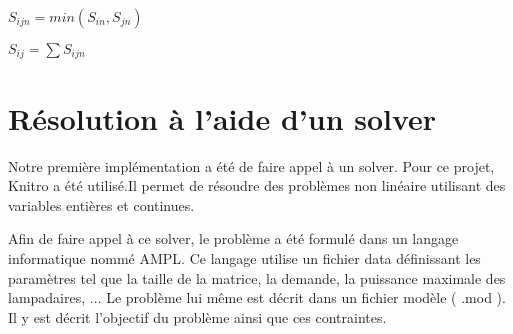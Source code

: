 $
S_{ijn}=min(S_{in},S_{jn})
$

$
S_{ij}=\sum{S_{ijn}}
$

\section{Résolution à l'aide d'un solver}
Notre première implémentation a été de faire appel à un solver. Pour ce projet, Knitro a été utilisé.Il permet de résoudre des problèmes non linéaire utilisant des variables entières et continues.

Afin de faire appel à ce solver, le problème a été formulé dans un langage informatique nommé AMPL. Ce langage utilise un fichier data définissant les paramètres tel que la taille de la matrice, la demande, la puissance maximale des lampadaires, ... 
Le problème lui même est décrit dans un fichier modèle ( .mod ). Il y est décrit l'objectif du problème ainsi que ces contraintes.



